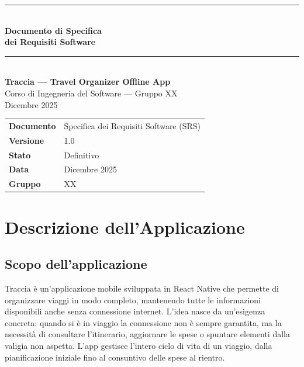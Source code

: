 \documentclass[12pt, a4paper]{article}
\begin{document}

\begin{titlepage}
  \centering
  \vspace*{1.8cm}
  {\color{primary}\rule{\linewidth}{1.5pt}}\\[0.5cm]
  {\Huge\bfseries\color{primary}
    Documento di Specifica\\[0.3cm]
    dei Requisiti Software}\\[0.5cm]
  {\color{primary}\rule{\linewidth}{1.5pt}}\\[1cm]
  {\LARGE\bfseries\color{secondary}Traccia --- Travel Organizer Offline App}\\[0.8cm]
  {\large Corso di Ingegneria del Software --- Gruppo XX}\\[0.3cm]
  {\large Dicembre 2025}\\[2.5cm]

  \begin{tabular}{ll}
    \toprule
    \textbf{Documento} & Specifica dei Requisiti Software (SRS) \\
    \textbf{Versione}  & 1.0 \\
    \textbf{Stato}     & Definitivo \\
    \textbf{Data}      & Dicembre 2025 \\
    \textbf{Gruppo}    & XX \\
    \bottomrule
  \end{tabular}
  \vfill
\end{titlepage}

\newpage
\tableofcontents
\newpage

\section{Descrizione dell'Applicazione}

\subsection{Scopo dell'applicazione}

Traccia è un'applicazione mobile sviluppata in React Native che permette di organizzare
viaggi in modo completo, mantenendo tutte le informazioni disponibili anche senza connessione
internet. L'idea nasce da un'esigenza concreta: quando si è in viaggio la connessione
non è sempre garantita, ma la necessità di consultare l'itinerario, aggiornare le spese
o spuntare elementi dalla valigia non aspetta. L'app gestisce l'intero ciclo di vita di
un viaggio, dalla pianificazione iniziale fino al consuntivo delle spese al rientro.
\end{document}
